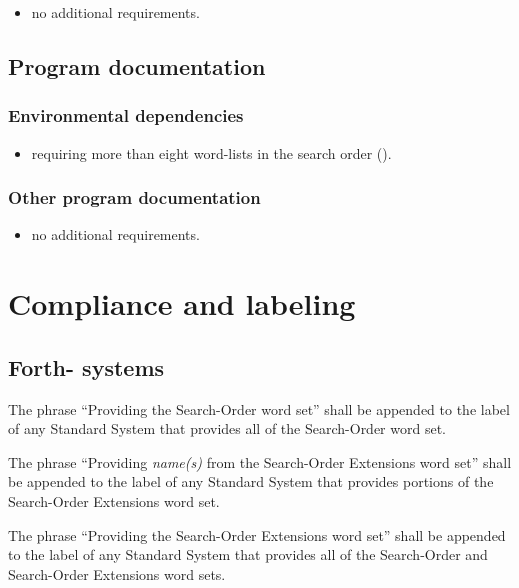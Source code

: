 \begin{itemize}
\item no additional requirements.
\end{itemize}

\subsection{Program documentation} %

\subsubsection{Environmental dependencies} %

\begin{itemize}
\item requiring more than eight word-lists in the search order
	().
\end{itemize}

\subsubsection{Other program documentation} %

\begin{itemize}
\item no additional requirements.
\end{itemize}


\section{Compliance and labeling} %

\cbstart{}
\subsection[Forth-\snapshot systems]{Forth-\snapshot{} systems} %
\cbend

The phrase ``Providing the Search-Order word set'' shall be
appended to the label of any Standard System that provides all of
the Search-Order word set.

The phrase ``Providing \emph{name(s)} from the Search-Order
Extensions word set'' shall be appended to the label of any
Standard System that provides portions of the Search-Order
Extensions word set.

The phrase ``Providing the Search-Order Extensions word set'' shall
be appended to the label of any Standard System that provides all of
the Search-Order and Search-Order Extensions word sets.

